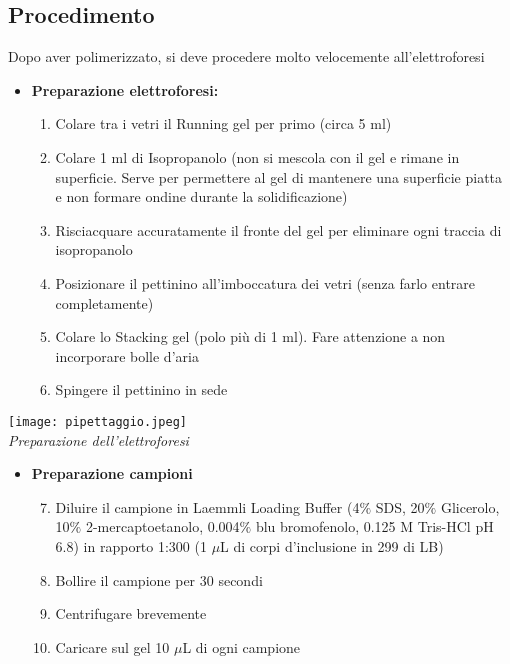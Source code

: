 \documentclass{extarticle}
\begin{document}
\begin{minipage}[c]{0.5\textwidth}
    \subsection*{Procedimento}
Dopo aver polimerizzato, si deve procedere molto velocemente all'elettroforesi
    \begin{itemize}
        \item \textbf{Preparazione elettroforesi:}
        \begin{enumerate}
            \item Colare tra i vetri il Running gel per primo (circa 5 ml)
            \item Colare 1 ml di Isopropanolo (non si mescola con il gel e rimane in superficie. Serve per permettere
            al gel di mantenere una superficie piatta e non formare ondine durante la solidificazione)
            \item Risciacquare accuratamente il fronte del gel per eliminare ogni traccia di isopropanolo
            \item Posizionare il pettinino all'imboccatura dei vetri (senza farlo entrare completamente)
            \item Colare lo Stacking gel (polo più di 1 ml). Fare attenzione a non incorporare bolle d'aria
            \item Spingere il pettinino in sede
        \end{enumerate}
    \end{itemize}
\end{minipage} \hfill
\begin{minipage}[c]{0.5\textwidth}
    \begin{center}
        \texttt{[image: pipettaggio.jpeg]}\\
        \emph{Preparazione dell'elettroforesi}
    \end{center}
\end{minipage}
\begin{itemize}
    \item \textbf{Preparazione campioni}
    \begin{enumerate}
        \setcounter{enumi}{6}
        \item Diluire il campione in Laemmli Loading Buffer (4$\%$ SDS, 20$\%$  Glicerolo, 10$\%$  2-mercaptoetanolo,
        0.004$\%$ blu bromofenolo, 0.125 M Tris-HCl pH 6.8) in rapporto 1:300 (1 $\mu$L di corpi d'inclusione in
        299 di LB)
        \item Bollire il campione per 30 secondi
        \item Centrifugare brevemente
        \item Caricare sul gel 10 $\mu$L di ogni campione
    \end{enumerate}
\end{itemize}
\end{document}
